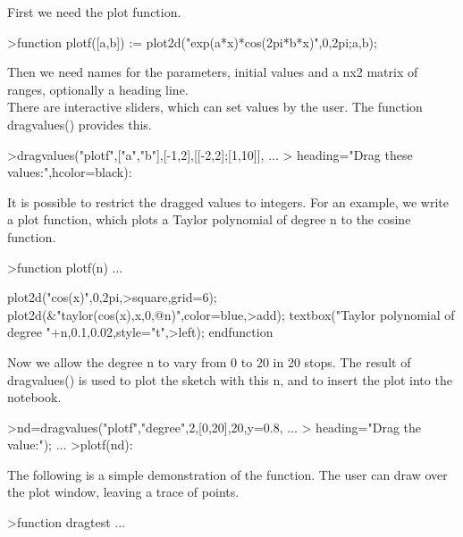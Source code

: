 \documentclass{article}
\begin{document}
\begin{eulernotebook}
\begin{eulercomment}
\begin{eulercomment}
\begin{eulercomment}
\begin{eulercomment}
\begin{eulercomment}
\begin{eulercomment}
\begin{eulercomment}
First we need the plot function.
\end{eulercomment}
\begin{eulerprompt}
>function plotf([a,b]) := plot2d("exp(a*x)*cos(2pi*b*x)",0,2pi;a,b);
\end{eulerprompt}
\begin{eulercomment}
Then we need names for the parameters, initial values and a nx2 matrix of ranges,
optionally a heading line.\\
There are interactive sliders, which can set values by the user. The function
dragvalues() provides this.
\end{eulercomment}
\begin{eulerprompt}
>dragvalues("plotf",["a","b"],[-1,2],[[-2,2];[1,10]], ...
>  heading="Drag these values:",hcolor=black):
\end{eulerprompt}
\begin{eulercomment}
It is possible to restrict the dragged values to integers. For an example, we write a
plot function, which plots a Taylor polynomial of degree n to the cosine function.
\end{eulercomment}
\begin{eulerprompt}
>function plotf(n) ...
\end{eulerprompt}
\begin{eulerudf}
  plot2d("cos(x)",0,2pi,>square,grid=6);
  plot2d(&"taylor(cos(x),x,0,@n)",color=blue,>add);
  textbox("Taylor polynomial of degree "+n,0.1,0.02,style="t",>left);
  endfunction
\end{eulerudf}
\begin{eulercomment}
Now we allow the degree n to vary from 0 to 20 in 20 stops. The result of dragvalues()
is used to plot the sketch with this n, and to insert the plot into the notebook.
\end{eulercomment}
\begin{eulerprompt}
>nd=dragvalues("plotf","degree",2,[0,20],20,y=0.8, ...
>   heading="Drag the value:"); ...
>plotf(nd):
\end{eulerprompt}
\begin{eulercomment}
The following is a simple demonstration of the function. The user can draw over the plot
window, leaving a trace of points.
\end{eulercomment}
\begin{eulerprompt}
>function dragtest ...
\end{eulerprompt}
\begin{eulerudf}

\end{eulerudf}
\end{eulercomment}
\end{eulercomment}
\end{eulercomment}
\end{eulercomment}
\end{eulercomment}
\end{eulercomment}
\end{eulernotebook}
\end{document}
